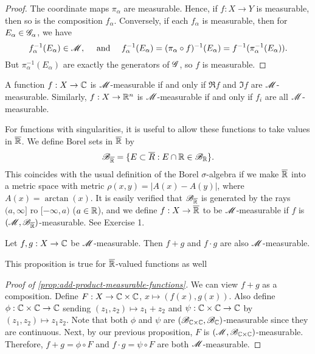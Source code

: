 \documentclass[12pt]{article} %
\begin{document}
\begin{proof}
    The coordinate maps $\pi_\alpha$ are measurable. Hence, if $f : X \to Y$ is measurable, then so is the composition $f_\alpha$. Conversely, if each $f_\alpha$ is measurable, then for $E_\alpha \in \mathscr{G}_\alpha$, we have \[f_\alpha^{-1}(E_\alpha) \in \SM, \ \ \ \ \text{and} \ \ \ \ f_\alpha^{-1}(E_\alpha) = (\pi_\alpha \circ f)^{-1}(E_\alpha) = f^{-1}(\pi_\alpha^{-1}(E_\alpha)).\] But $\pi_\alpha^{-1}(E_\alpha)$ are exactly the generators of $\mathscr{G}$, so $f$ is measurable.
\end{proof}

\begin{corollary}
    A function $f : X \to \mathbb{C}$ is $\mathscr{M}$-measurable if and only if $\Re f$ and $\Im f$ are $\mathscr{M}$-measurable. Similarly, $f : X \to \mathbb{R}^n$ is $\mathscr{M}$-measurable if and only if $f_i$ are all $\mathscr{M}$-measurable.
\end{corollary}

For functions with singularities, it is useful to allow these functions to take values in $\overline{\mathbb{R}}$. We define Borel sets in $\overline{\mathbb{R}}$ by \[\mathscr{B}_{\overline{\mathbb{R}}} = \{E \subset \overline{R} : E \cap \mathbb{R} \in \mathscr{B}_{\mathbb{R}}\}.\] This coincides with the usual definition of the Borel $\sigma$-algebra if we make $\overline{\mathbb{R}}$ into a metric space with metric $\rho(x, y) = |A(x) - A(y)|$, where $A(x) = \arctan(x)$. It is easily verified that $\mathscr{B}_{\overline{\mathbb{R}}}$ is generated by the rays $(a, \infty]$ ro $[-\infty, a)$ ($a \in \mathbb{R}$), and we define $f : X \to \overline{\mathbb{R}}$ to be $\mathscr{M}$-measurable if $f$ is $(\mathscr{M}, \mathscr{B}_{\overline{\mathbb{R}}})$-measurable. See Exercise 1.

\begin{proposition}\label{prop:add-product-measurable-functions}
    Let $f, g : X \to \mathbb{C}$ be $\mathscr{M}$-measurable. Then $f + g$ and $f\cdot g$ are also $\mathscr{M}$-measurable.
\end{proposition}

\begin{remark}
    This proposition is true for $\overline{\mathbb{R}}$-valued functions as well
\end{remark}

\begin{proof}[Proof of \cref{prop:add-product-measurable-functions}]
    We can view $f + g$ as a composition. Define $F : X \to \mathbb{C} \times \mathbb{C}$, $x \mapsto (f(x), g(x))$. Also define $\phi : \mathbb{C} \times \mathbb{C} \to \mathbb{C}$ sending $(z_1, z_2) \mapsto z_1 + z_2$ and $\psi : \mathbb{C} \times \mathbb{C} \to \mathbb{C}$ by $(z_1, z_2) \mapsto z_1 z_2$. Note that both $\phi$ and $\psi$ are $(\mathscr{B}_{\mathbb{C} \times \mathbb{C}}, \mathscr{B}_{\mathbb{C}})$-measurable since they are continuous. Next, by our previous proposition, $F$ is $(\mathscr{M}, \mathscr{B}_{\mathbb{C} \times \mathbb{C}})$-measurable. Therefore, $f + g = \phi \circ F$ and $f \cdot g = \psi \circ F$ are both $\mathscr{M}$-measurable.
\end{proof}
\end{document}
